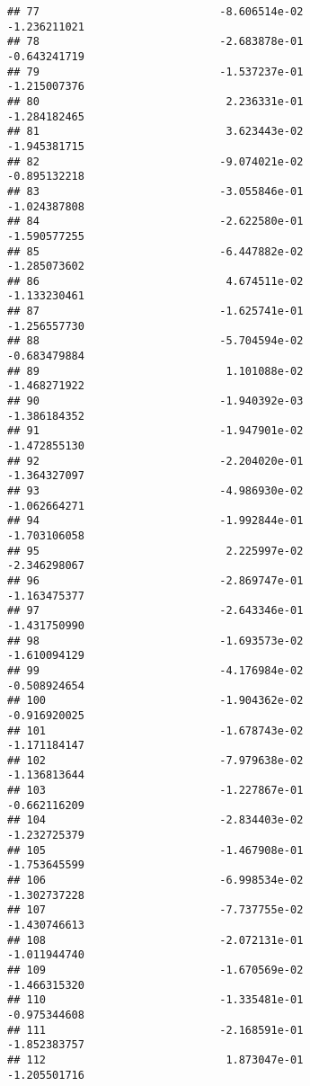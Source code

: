 \documentclass[
]{article}
\begin{document}
\begin{verbatim}
## 77                            -8.606514e-02               -1.236211021
## 78                            -2.683878e-01               -0.643241719
## 79                            -1.537237e-01               -1.215007376
## 80                             2.236331e-01               -1.284182465
## 81                             3.623443e-02               -1.945381715
## 82                            -9.074021e-02               -0.895132218
## 83                            -3.055846e-01               -1.024387808
## 84                            -2.622580e-01               -1.590577255
## 85                            -6.447882e-02               -1.285073602
## 86                             4.674511e-02               -1.133230461
## 87                            -1.625741e-01               -1.256557730
## 88                            -5.704594e-02               -0.683479884
## 89                             1.101088e-02               -1.468271922
## 90                            -1.940392e-03               -1.386184352
## 91                            -1.947901e-02               -1.472855130
## 92                            -2.204020e-01               -1.364327097
## 93                            -4.986930e-02               -1.062664271
## 94                            -1.992844e-01               -1.703106058
## 95                             2.225997e-02               -2.346298067
## 96                            -2.869747e-01               -1.163475377
## 97                            -2.643346e-01               -1.431750990
## 98                            -1.693573e-02               -1.610094129
## 99                            -4.176984e-02               -0.508924654
## 100                           -1.904362e-02               -0.916920025
## 101                           -1.678743e-02               -1.171184147
## 102                           -7.979638e-02               -1.136813644
## 103                           -1.227867e-01               -0.662116209
## 104                           -2.834403e-02               -1.232725379
## 105                           -1.467908e-01               -1.753645599
## 106                           -6.998534e-02               -1.302737228
## 107                           -7.737755e-02               -1.430746613
## 108                           -2.072131e-01               -1.011944740
## 109                           -1.670569e-02               -1.466315320
## 110                           -1.335481e-01               -0.975344608
## 111                           -2.168591e-01               -1.852383757
## 112                            1.873047e-01               -1.205501716

\end{verbatim}
\end{document}

